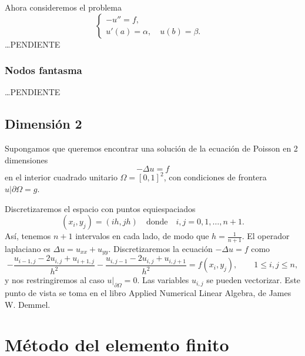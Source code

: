 \documentclass[11pt,letterpaper]{report}
\begin{document}
Ahora consideremos el problema
\begin{equation}
  \left\{
    \begin{aligned}
      -u'' = f,&
      \\
      u'(a)=\alpha,\quad u(b)=\beta.&
    \end{aligned}
  \right.
\end{equation}
\dots PENDIENTE

\subsubsection{Nodos fantasma}
\dots PENDIENTE


\subsection{Dimensión 2}

Supongamos que queremos encontrar una solución de la ecuación de
Poisson en 2 dimensiones
\begin{equation}
  -\Delta u = f
\end{equation}
en el interior cuadrado unitario $\Omega=[0,1]^{2}$, con condiciones
de frontera $u|\partial\Omega = g$.

Discretizaremos el espacio con puntos equiespaciados
\begin{equation}
  (x_i,y_j)=(ih,jh) \quad \text{donde} \quad i,j=0,1,\dots,n+1
.\end{equation}
Así, tenemos $n+1$ intervalos en cada lado, de modo que
$h=\frac{1}{n+1}$.
El operador laplaciano es $\Delta u = u_{xx}+u_{yy}$. Discretizaremos
la ecuación $-\Delta u = f$ como
\begin{equation}
  -\frac{u_{i-1,j} - 2u_{i,j} + u_{i+1,j}}{h^{2}}
  -\frac{u_{i,j-1} - 2u_{i,j} + u_{i,j+1}}{h^{2}}
  =
  f(x_i,y_j),
  \qquad
  1\leq i,j\leq n
,\end{equation}
y nos restringiremos al caso $u|_{\partial\Omega}=0$.
Las variables $u_{i,j}$ se pueden vectorizar. Este punto de vista se
toma en el libro Applied Numerical Linear Algebra, de James W.
Demmel.

\section{Método del elemento finito}
\end{document}
